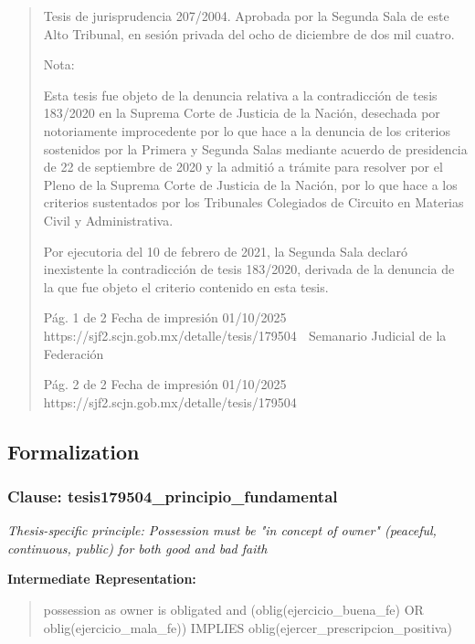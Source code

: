 \documentclass[11pt,a4paper]{article}
\begin{document}
\begin{quote}
Tesis de jurisprudencia 207/2004. Aprobada por la Segunda Sala de este Alto Tribunal, en sesión
privada del ocho de diciembre de dos mil cuatro.

Nota:

Esta tesis fue objeto de la denuncia relativa a la contradicción de tesis 183/2020 en la Suprema
Corte de Justicia de la Nación, desechada por notoriamente improcedente por lo que hace a la
denuncia de los criterios sostenidos por la Primera y Segunda Salas mediante acuerdo de
presidencia de 22 de septiembre de 2020 y la admitió a trámite para resolver por el Pleno de la
Suprema Corte de Justicia de la Nación, por lo que hace a los criterios sustentados por los
Tribunales Colegiados de Circuito en Materias Civil y Administrativa.

Por ejecutoria del 10 de febrero de 2021, la Segunda Sala declaró inexistente la contradicción de
tesis 183/2020, derivada de la denuncia de la que fue objeto el criterio contenido en esta tesis.

                                             Pág. 1 de 2             Fecha de impresión 01/10/2025
  https://sjf2.scjn.gob.mx/detalle/tesis/179504
                                                Semanario Judicial de la Federación




                                           Pág. 2 de 2       Fecha de impresión 01/10/2025
https://sjf2.scjn.gob.mx/detalle/tesis/179504

\end{quote}

\subsection{Formalization}

\subsubsection{Clause: tesis179504\_principio\_fundamental}

\textit{Thesis-specific principle: Possession must be "in concept of owner" (peaceful, continuous, public) for both good and bad faith}

\textbf{Intermediate Representation:}

\begin{quote}
possession as owner is obligated and (oblig(ejercicio\_buena\_fe) OR oblig(ejercicio\_mala\_fe)) IMPLIES oblig(ejercer\_prescripcion\_positiva)
\end{quote}
\end{document}
